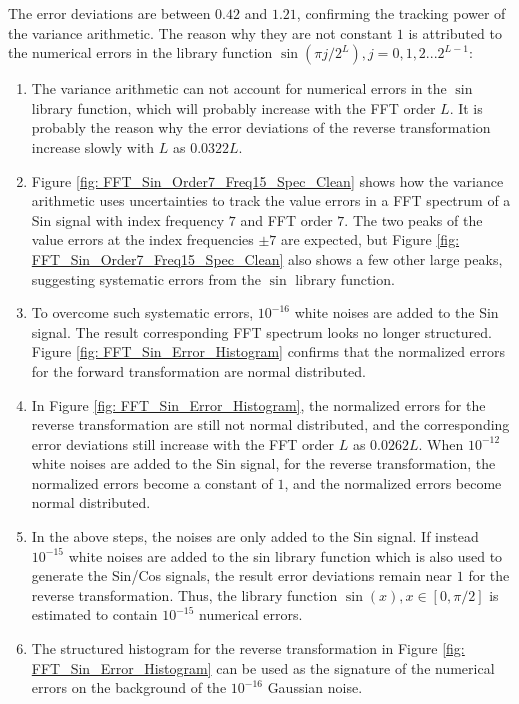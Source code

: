 \documentclass[twoside]{article}
\numberwithin{equation}{section}
\begin{document}
The error deviations are between $0.42$ and $1.21$, confirming the tracking power of the variance arithmetic.
The reason why they are not constant $1$ is attributed to the numerical errors in the library function $\sin(\pi j /2^L), j = 0, 1, 2 ... 2^{L-1}$:
\begin{enumerate}
\item The variance arithmetic can not account for numerical errors in the $\sin$ library function, which will probably increase with the FFT order $L$.
It is probably the reason why the error deviations of the reverse transformation increase slowly with $L$ as $0.0322 L$.

\item Figure \ref{fig: FFT_Sin_Order7_Freq15_Spec_Clean} shows how the variance arithmetic uses uncertainties to track the value errors in a FFT spectrum of a Sin signal with index frequency $7$ and FFT order $7$.
The two peaks of the value errors at the index frequencies $\pm 7$ are expected, but Figure \ref{fig: FFT_Sin_Order7_Freq15_Spec_Clean} also shows a few other large peaks, suggesting systematic errors from the $\sin$ library function.

\item To overcome such systematic errors, $10^{-16}$ white noises are added to the Sin signal.
The result corresponding FFT spectrum looks no longer structured. 
Figure \ref{fig: FFT_Sin_Error_Histogram} confirms that the normalized errors for the forward transformation are normal distributed.

\item In Figure \ref{fig: FFT_Sin_Error_Histogram}, the normalized errors for the reverse transformation are still not normal distributed, and the corresponding error deviations still increase with the FFT order $L$ as $0.0262 L$.
When $10^{-12}$ white noises are added to the Sin signal, for the reverse transformation, the normalized errors become a constant of $1$, and the normalized errors become normal distributed.

\item In the above steps, the noises are only added to the Sin signal.
If instead $10^{-15}$ white noises are added to the sin library function which is also used to generate the Sin/Cos signals, the result error deviations remain near $1$ for the reverse transformation.
Thus, the library function $\sin(x), x \in [0, \pi/2]$ is estimated to contain $10^{-15}$ numerical errors.

\item The structured histogram for the reverse transformation in Figure \ref{fig: FFT_Sin_Error_Histogram} can be used as the signature of the numerical errors on the background of the $10^{-16}$ Gaussian noise.

\end{enumerate}
\end{document}
